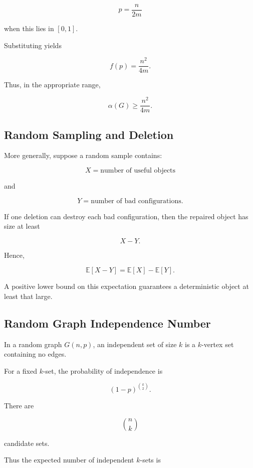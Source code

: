 \[
\boxed{
p=\frac{n}{2m}
}
\]

when this lies in \([0,1]\).

Substituting yields

\[
f(p)
=
\frac{n^2}{4m}.
\]

Thus, in the appropriate range,

\[
\boxed{
\alpha(G)
\geq
\frac{n^2}{4m}.
}
\]

\subsection{Random Sampling and Deletion}
\label{subsec:random-sampling-deletion}

More generally, suppose a random sample contains:

\[
X
=
\text{number of useful objects}
\]

and

\[
Y
=
\text{number of bad configurations}.
\]

If one deletion can destroy each bad configuration, then the repaired
object has size at least

\[
X-Y.
\]

Hence,

\[
\boxed{
\mathbb{E}[X-Y]
=
\mathbb{E}[X]-\mathbb{E}[Y].
}
\]

A positive lower bound on this expectation guarantees a deterministic
object at least that large.

\subsection{Random Graph Independence Number}
\label{subsec:random-graph-independence-preview}

In a random graph \(G(n,p)\), an independent set of size \(k\) is a
\(k\)-vertex set containing no edges.

For a fixed \(k\)-set, the probability of independence is

\[
\boxed{
(1-p)^{\binom{k}{2}}.
}
\]

There are

\[
\binom nk
\]

candidate sets.

Thus the expected number of independent \(k\)-sets is

